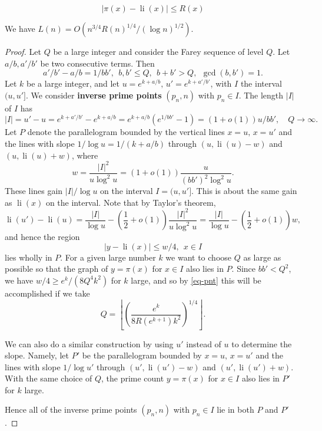 \documentclass[10pt,a4paper]{amsart}
\DeclareMathOperator{\li}{li}
\begin{document}
\begin{equation}
\label{eq-pnt}
|\pi(x)-\li(x)|\le R(x)
\end{equation}

\begin{theorem}
\label{th-L(n)}
We have $L(n)=O(n^{3/4}R(n)^{1/4}/(\log n)^{1/2})$.
\end{theorem}

\begin{proof}
Let $Q$ be a large integer and
consider the Farey sequence of
level $Q$.  Let $a/b, a'/b'$ be two consecutive terms.  Then
\[
a'/b'-a/b = 1/bb',~~b,b'\le Q,~~b+b'>Q,~~\gcd(b,b')=1.
\]
Let $k$ be a large integer, and let
 $u=e^{k+a/b},\,u'=e^{k+a'/b'}$, with $I$ the interval $(u,u']$.  We consider \textbf{inverse prime points} $(p_n,n)$
with $p_n\in I$.   The length $|I|$ of $I$ has
\[
|I|=u'-u=e^{k+a'/b'}-e^{k+a/b}=e^{k+a/b}(e^{1/bb'}-1)=(1+o(1))u/bb', \quad Q\to\infty.
\]
Let $P$ denote the parallelogram bounded by the vertical lines $x=u,\, x=u'$
and the lines with slope $1/\log u=1/(k+a/b)$ through $(u, \li(u)-w)$ and $(u,\li(u)+w)$,
where
\[
w=\frac{|I|^2}{u\log^2u}=(1+o(1))\frac u{(bb')^2\log^2u}.
\]
These lines gain $|I|/\log u$ on the interval $I = (u,u']$.  This is about the same gain as
$\li(x)$ on the interval.  Note that by Taylor's theorem,
\[
\li(u')-\li(u)=\frac{|I|}{\log u}-\left(\frac12+o(1)\right)\frac{|I|^2}{u\log^2 u}=\frac{|I|}{\log u}-\left(\frac12+o(1)\right)w,
\]
and hence the region
\[
    |y-\li(x)|\le w/4,~~x\in I
\]
lies wholly in $P$.
For a given large number $k$ we want to choose $Q$ as large as possible so that the graph of $y=\pi(x)$ for $x\in I$ also lies in $P$.
Since $bb'<Q^2$, we have $w/4 \geq e^k / (8Q^4 k^2)$ for $k$ large, and so by \eqref{eq-pnt} this will be accomplished if we take
\[
Q=\left\lfloor \left(\frac{e^k}{8R(e^{k+1})k^2}\right)^{1/4}\right\rfloor.
\]

We can also do a similar construction by using $u'$ instead of $u$ to determine the slope.
Namely, let $P'$ be the parallelogram bounded by
$x=u,\,x=u'$ and the lines with slope $1/\log u'$ through $(u',\li(u')- w)$ and $(u',\li(u')+ w)$.
With the same choice of $Q$, the prime count $y=\pi(x)$ for $x\in I$ also lies in $P'$ for $k$ large.

Hence all of the inverse prime points $(p_n,n)$ with $p_n\in I$ lie in both $P$ and $P'$.  


\end{proof}
\end{document}
